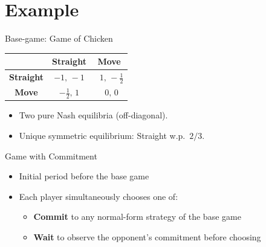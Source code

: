 \documentclass[../slides.tex]{subfiles}
\begin{document}
\section{Example}
\begin{frame}{Base-game: Game of Chicken}
\centering
\renewcommand{\arraystretch}{1.2}
\begin{tabular}{c|cc}
           & \textbf{Straight} & \textbf{Move} \\ \hline
\textbf{Straight} & $-1,\,-1$ & $\;\;1,\,-\tfrac12$ \\[2pt]
\textbf{Move}   & $-\tfrac12,\,1$ & $\;\;0,\,0$
\end{tabular}
\medskip

\begin{itemize}
  \item Two pure Nash equilibria (off-diagonal).  
  \item Unique symmetric equilibrium: Straight w.p.\ $2/3$.
\end{itemize}
\end{frame}
\begin{frame}{Game with Commitment}
\vspace{1ex}
\begin{itemize}
    \item Initial period before the base game
    \vspace{1ex}
    \item Each player simultaneously chooses one of:
    \vspace{0.5ex}
        \begin{itemize}
          \item \textbf{Commit} to any normal-form strategy of the base game
          \vspace{0.5ex}
          \item \textbf{Wait} to observe the opponent’s commitment before choosing
        \end{itemize}
\end{itemize}
\end{frame}
\end{document}

